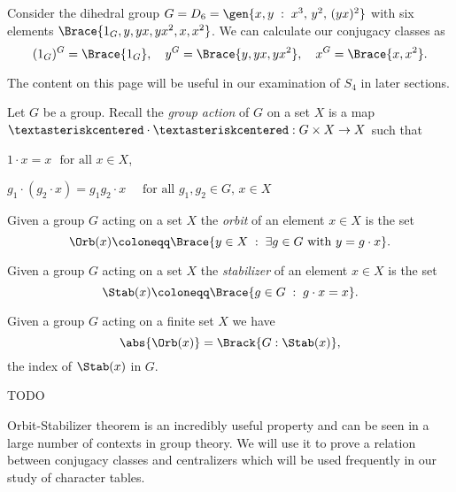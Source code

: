 \documentclass[../Project.tex]{subfiles}
\begin{document}
	\begin{exam}
		\label{examconjofD6}
		Consider the dihedral group $G = D_6 = \gen{x,y\;:\;x^3,\, y^2,\,(yx)^2}$ with six elements $\Brace{1_G,y,yx,yx^2,x,x^2}$. We can calculate our conjugacy classes as 
		$$(1_G)^G = \Brace{1_G},\quad y^G = \Brace{y,yx,yx^2},\quad x^G = \Brace{x,x^2}.$$
	\end{exam}


The content on this page will be useful in our examination of $S_4$ in later sections.


\newpage
\begin{defi}
	Let $G$ be a group. Recall the \textit{group action} of $G$ on a set $X$ is a map $\textasteriskcentered \cdot \textasteriskcentered : G \times X \to X$ such that
	\begin{menum}
		\item $1 \cdot x = x$ $\text{ for all } x \in X$,
		\item $g_1 \cdot (g_2 \cdot x) = g_1g_2 \cdot x\quad\text{ for all } g_1,g_2 \in G,\,x \in X$
	\end{menum}
\end{defi}

\begin{defi}
	Given a group $G$ acting on a set $X$ the \textit{orbit} of an element $x \in X$ is the set
	$$\Orb(x) \coloneqq \Brace{y \in X\;:\; \exists g \in G \text{ with } y = g \cdot x}.$$
\end{defi}

\begin{defi}
	Given a group $G$ acting on a set $X$ the \textit{stabilizer} of an element $x \in X$ is the set
	$$\Stab(x) \coloneqq \Brace{g \in G\;:\; g \cdot x = x}.$$
\end{defi}

\begin{theo}
	Given a group $G$ acting on a finite set $X$ we have
	$$\abs{\Orb(x)} = \Brack{G : \Stab(x)},$$
	the index of $\Stab(x)$ in $G$.
\end{theo}
\begin{proo*}
TODO
\end{proo*}

Orbit-Stabilizer theorem is an incredibly useful property and can be seen in a large number of contexts in group theory. We will use it to prove a relation between conjugacy classes and centralizers which will be used frequently in our study of character tables.
\end{document}
